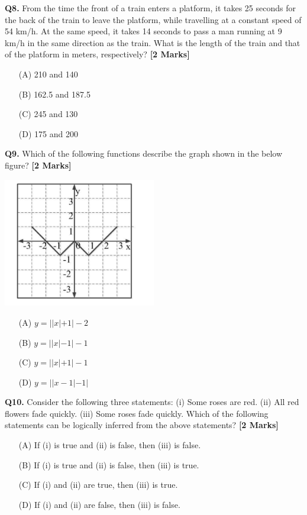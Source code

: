 \documentclass[11pt]{article}
\newcommand{\questionb}[2]{
    \noindent\textbf{Q#2.} #1 \hfill \textbf{[2 Marks]}
}
\begin{document}
\questionb{From the time the front of a train enters a platform, it takes 25 seconds for the back of the train to leave the platform, while travelling at a constant speed of 54 km/h. At the same speed, it takes 14 seconds to pass a man running at 9 km/h in the same direction as the train. What is the length of the train and that of the platform in meters, respectively?}{8}
\begin{enumerate}
    \item[(A)] 210 and 140  
    \item[(B)] 162.5 and 187.5  
    \item[(C)] 245 and 130  
    \item[(D)] 175 and 200  
\end{enumerate}
\vspace{0.5cm}

\questionb{Which of the following functions describe the graph shown in the below figure?}{9}
\begin{center}
\includegraphics[width=0.5\textwidth]{figures/9.png}
\end{center}
\begin{enumerate}
    \item[(A)] \( y = ||x| + 1| - 2 \)  
    \item[(B)] \( y = ||x| - 1| - 1 \)  
    \item[(C)] \( y = ||x| + 1| - 1 \)  
    \item[(D)] \( y = ||x - 1| - 1| \)  
\end{enumerate}
\vspace{0.5cm}

\questionb{Consider the following three statements: (i) Some roses are red. (ii) All red flowers fade quickly. (iii) Some roses fade quickly. Which of the following statements can be logically inferred from the above statements?}{10}
\begin{enumerate}
    \item[(A)] If (i) is true and (ii) is false, then (iii) is false.  
    \item[(B)] If (i) is true and (ii) is false, then (iii) is true.  
    \item[(C)] If (i) and (ii) are true, then (iii) is true.  
    \item[(D)] If (i) and (ii) are false, then (iii) is false.  
\end{enumerate}
\vspace{0.5cm}
\end{document}
